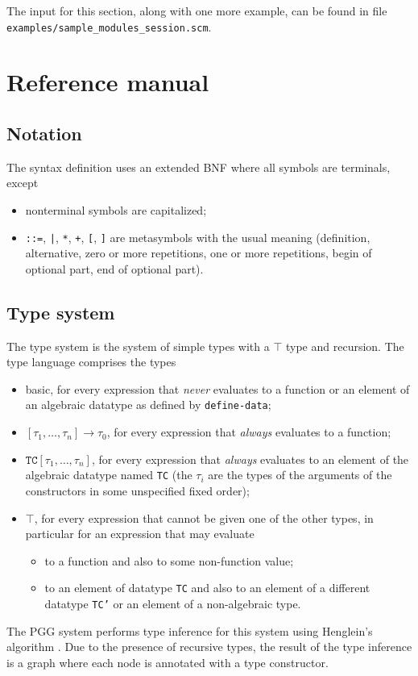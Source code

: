 \documentclass[11pt]{article}
\makeatletter
\newcommand{\indextt}[1]{\index{#1@\texttt{#1}}}
\makeatother
\begin{document}
The input for this section, along with one more example, can be found in file
\texttt{examples/sample\_modules\_session.scm}. 

\clearpage
\section{Reference manual}
\label{sec:reference}


\subsection{Notation}
\label{sec:notation}

The syntax definition uses an extended BNF where all symbols are
terminals, except 
\begin{itemize}
\item nonterminal symbols are capitalized;
\item \verb-::=-, \verb-|-, \verb-*-, \verb-+-, \verb-[-, \verb-]- are
  metasymbols with the usual meaning (definition, alternative, zero or
  more repetitions, one or more repetitions, begin of optional part, end
  of optional part).
\end{itemize}

\subsection{Type system}
\label{sec:type-system}

The type system is the system of simple types with a $\top$ type and
recursion. The type language comprises the types
\begin{itemize}
\item basic, for every expression that \emph{never} evaluates to a
  function or an element of an algebraic datatype as defined by
  \texttt{define-data};\indextt{define-data}
\item $[\tau_1,\dots,\tau_n]\rightarrow\tau_0$, for every expression that
  \emph{always} evaluates to a function;
\item $\texttt{TC}[\tau_1,\dots,\tau_n]$, for every expression that
  \emph{always} evaluates to an element of the algebraic datatype
  named \texttt{TC} (the $\tau_i$ are the types of the arguments of
  the constructors in some unspecified fixed order);
\item $\top$, for every expression that cannot be given one of the
  other types, in particular for an expression that may evaluate
  \begin{itemize}
  \item to a function and also to some non-function value;
  \item to an element of datatype \texttt{TC} and also to an element
    of a different datatype \texttt{TC'} or an element of a
    non-algebraic type.
  \end{itemize}
\end{itemize}
The PGG system performs type inference for this system using
Henglein's algorithm \cite{Henglein1991}.
Due to the presence of recursive types, the result of the type
inference is a graph where each node is annotated with a type constructor.
\end{document}
